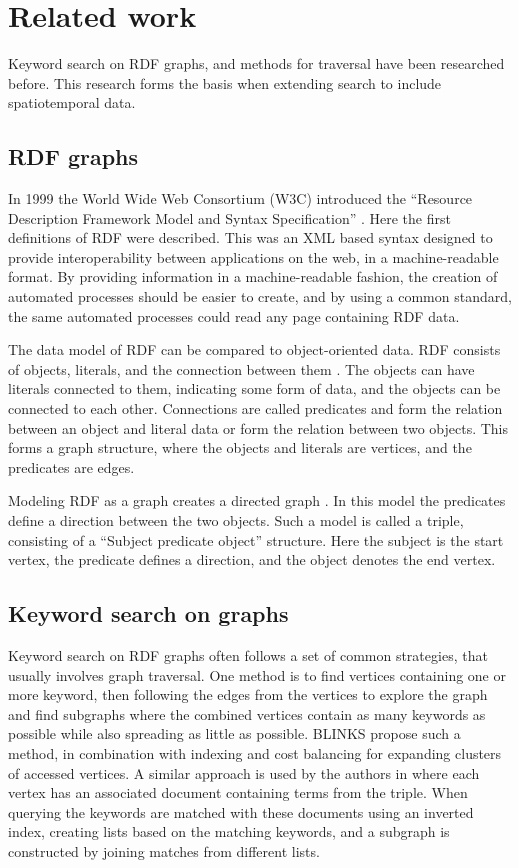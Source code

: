 \chapter{Related work}
\label{cha:related_work}
Keyword search on RDF graphs, and methods for traversal have been researched before. This research forms the basis when extending search to include spatiotemporal data.

\section{RDF graphs}
In 1999 the World Wide Web Consortium (W3C) introduced the ``Resource Description Framework Model and Syntax Specification'' \cite{brickley1999resource}. Here the first definitions of RDF were described. This was an XML based syntax designed to provide interoperability between applications on the web, in a machine-readable format. By providing information in a machine-readable fashion, the creation of automated processes should be easier to create, and by using a common standard, the same automated processes could read any page containing RDF data.

The data model of RDF can be compared to object-oriented data. RDF consists of objects, literals, and the connection between them \cite{decker2000framework}. The objects can have literals connected to them, indicating some form of data, and the objects can be connected to each other. Connections are called predicates and form the relation between an object and literal data or form the relation between two objects. This forms a graph structure, where the objects and literals are vertices, and the predicates are edges.

Modeling RDF as a graph creates a directed graph \cite{mcbride2002jena}. In this model the predicates define a direction between the two objects. Such a model is called a triple, consisting of a ``Subject predicate object'' structure\cite{decker2000framework}. Here the subject is the start vertex, the predicate defines a direction, and the object denotes the end vertex.

\section{Keyword search on graphs}
Keyword search on RDF graphs often follows a set of common strategies, that usually involves graph traversal. One method is to find vertices containing one or more keyword, then following the edges from the vertices to explore the graph and find subgraphs where the combined vertices contain as many keywords as possible while also spreading as little as possible. BLINKS \cite{blinks} propose such a method, in combination with indexing and cost balancing for expanding clusters of accessed vertices. A similar approach is used by the authors in \cite{Elbassuoni:2011:KSO:2063576.2063615} where each vertex has an associated document containing terms from the triple. When querying the keywords are matched with these documents using an inverted index, creating lists based on the matching keywords, and a subgraph is constructed by joining matches from different lists.

